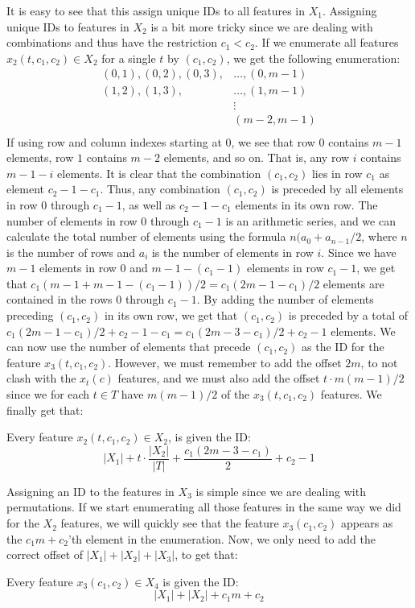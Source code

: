 It is easy to see that this assign unique IDs to all features in $X_1$.
Assigning unique IDs to features in $X_2$ is a bit more tricky since we are dealing with combinations and thus have the restriction $c_1 < c_2$.
If we enumerate all features $x_2(t, c_1, c_2) \in X_2$ for a single $t$ by $(c_1, c_2)$, we get the following enumeration:
\begin{align*}
(0, 1), (0, 2), (0, 3),& \dots, (0, m-1)\\
        (1, 2), (1, 3),& \dots, (1, m-1)\\
                        & \vdots    \\
                         &      (m-2, m-1)\\                   
\end{align*}
If using row and column indexes starting at $0$, we see that row $0$ contains $m-1$ elements, row $1$ contains $m-2$ elements, and so on.
That is, any row $i$ contains $m-1-i$ elements.
It is clear that the combination $(c_1, c_2)$ lies in row $c_1$ as element $c_2 - 1 - c_1$.
Thus, any combination $(c_1, c_2)$ is preceded by all elements in row $0$ through $c_1 - 1$, as well as $c_2 - 1 - c_1$ elements in its own row.
The number of elements in row $0$ through $c_1 - 1$ is an arithmetic series, and we can calculate the total number of elements
using the formula $n(a_0 + a_{n-1}/2$, where $n$ is the number of rows and $a_i$ is the number of elements in row $i$.
Since we have $m-1$ elements in row $0$ and $m - 1 - (c_1 - 1)$ elements in row $c_1 - 1$,
we get that $c_1(m-1 + m-1-(c_1-1))/2 = c_1(2m-1-c_1)/2$ elements are contained in the rows $0$ through $c_1 - 1$.
By adding the number of elements preceding $(c_1, c_2)$ in its own row, we get that $(c_1, c_2)$ is preceded by a total of
$c_1(2m-1-c_1)/2 + c_2-1-c_1 = c_1(2m-3-c_1)/2 + c_2-1$ elements.
We can now use the number of elements that precede $(c_1, c_2)$ as the ID for the feature $x_3(t, c_1, c_2)$. However, we must remember to add the offset $2m$, to not clash with the $x_t(c)$ features, and we must also add the offset $t \cdot m(m-1)/2$ since we for each $t \in T$ have $m(m-1)/2$ of the $x_3(t, c_1, c_2)$ features.
We finally get that:

\begin{center}
Every feature $x_2(t, c_1, c_2) \in X_2$, is given the ID:
\[ |X_1| + t \cdot \frac{|X_2|}{|T|} + \frac{c_1(2m-3-c_1)}{2} + c_2-1\]
\end{center}

Assigning an ID to the features in $X_3$ is simple since we are dealing with permutations. If we start enumerating all those features in the same way we did for the $X_2$ features, we will quickly see that the feature $x_3(c_1, c_2)$ appears as the $c_1m+c_2$'th element in the enumeration.
Now, we only need to add the correct offset of $|X_1| + |X_2| + |X_3|$, to get that:
\begin{center}
Every feature $x_3(c_1, c_2) \in X_4$ is given the ID:
\[|X_1| + |X_2| + c_1m+c_2\]
\end{center}

